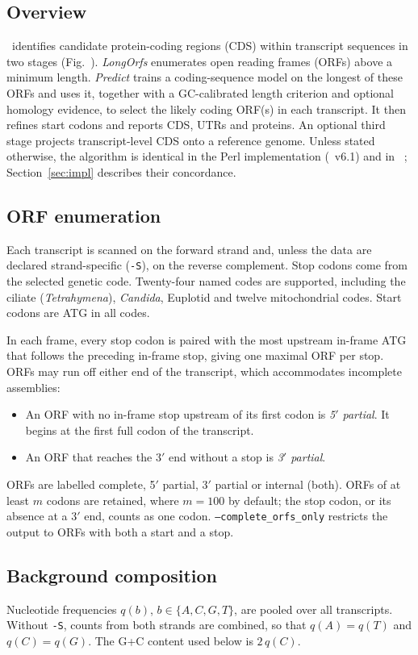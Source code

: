 \subsection{Overview}
\TD\ identifies candidate protein-coding regions (CDS) within transcript sequences in two stages
(Fig.~). \emph{LongOrfs} enumerates open reading frames (ORFs) above a minimum
length. \emph{Predict} trains a coding-sequence model on the longest of these ORFs and uses it,
together with a GC-calibrated length criterion and optional homology evidence, to select the likely
coding ORF(s) in each transcript. It then refines start codons and reports CDS, UTRs and proteins.
An optional third stage projects transcript-level CDS onto a reference genome. Unless stated
otherwise, the algorithm is identical in the Perl implementation (\TD\ v6.1) and in \PyTD\
; Section~\ref{sec:impl} describes their concordance.

\subsection{ORF enumeration}
Each transcript is scanned on the forward strand and, unless the data are declared strand-specific
(\texttt{-S}), on the reverse complement. Stop codons come from the selected genetic code. Twenty-four
named codes are supported, including the ciliate (\emph{Tetrahymena}), \emph{Candida}, Euplotid and
twelve mitochondrial codes. Start codons are ATG in all codes.

In each frame, every stop codon is paired with the most upstream in-frame ATG that follows the
preceding in-frame stop, giving one maximal ORF per stop. ORFs may run off either end of the
transcript, which accommodates incomplete assemblies:
\begin{itemize}
  \item An ORF with no in-frame stop upstream of its first codon is \emph{5$'$ partial}. It begins at
        the first full codon of the transcript.
  \item An ORF that reaches the 3$'$ end without a stop is \emph{3$'$ partial}.
\end{itemize}
ORFs are labelled complete, 5$'$ partial, 3$'$ partial or internal (both). ORFs of at least $m$
codons are retained, where $m=100$ by default; the stop codon, or its absence at a 3$'$ end, counts
as one codon. \texttt{--complete\_orfs\_only} restricts the output to ORFs with both a start and a
stop.

\subsection{Background composition}
Nucleotide frequencies $q(b)$, $b\in\{A,C,G,T\}$, are pooled over all transcripts. Without
\texttt{-S}, counts from both strands are combined, so that $q(A)=q(T)$ and $q(C)=q(G)$. The G+C
content used below is $2\,q(C)$.

